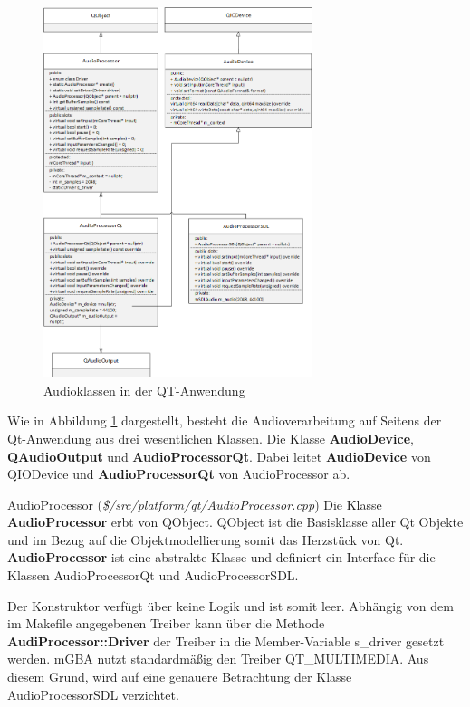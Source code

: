 \documentclass[11pt,a4paper]{scrartcl}
\begin{document}
\begin{figure}[h]
    \centering
    \includegraphics[width=0.7\textwidth]{QT_Klassendiagramm}
    \caption{Audioklassen in der QT-Anwendung}
    \label{fig:qtclassdiagramm}
\end{figure}

Wie in Abbildung \ref{fig:qtclassdiagramm} dargestellt, besteht die Audioverarbeitung auf Seitens der Qt-Anwendung aus drei wesentlichen Klassen. Die Klasse \textbf{AudioDevice}, \textbf{QAudioOutput} und \textbf{AudioProcessorQt}.
Dabei leitet \textbf{AudioDevice} von QIODevice und \textbf{AudioProcessorQt} von AudioProcessor ab.

\newpage

\vspace{5mm}
\large AudioProcessor \normalsize(\textit{\$/src/platform/qt/AudioProcessor.cpp})
\vspace{2mm}\newline
Die Klasse \textbf{AudioProcessor} erbt von QObject. QObject ist die Basisklasse aller Qt Objekte und im Bezug auf die Objektmodellierung somit das Herzst\"uck von Qt. \textbf{AudioProcessor} ist eine abstrakte Klasse und definiert
ein Interface f\"ur die Klassen AudioProcessorQt und AudioProcessorSDL.

Der Konstruktor verf\"ugt \"uber keine Logik und ist somit leer. Abh\"angig von dem im Makefile angegebenen Treiber kann \"uber die Methode \textbf{AudiProcessor::Driver} der Treiber in die Member-Variable s\_driver gesetzt werden. mGBA nutzt standardm\"a{\ss}ig den Treiber QT\_MULTIMEDIA. Aus diesem Grund, wird auf eine genauere Betrachtung
der Klasse AudioProcessorSDL verzichtet. 
\end{document}
